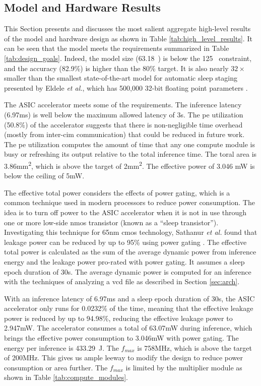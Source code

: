 \subsection{Model and Hardware Results}
This Section presents and discusses the most salient aggregate high-level results of the model and hardware design as shown in Table \ref{tab:high_level_results}.
It can be seen that the model meets the requirements summarized in Table \ref{tab:design_goals}. Indeed, the model size (63.18\si{\kilo\byte}) is below the
125\si{\kilo\byte} constraint, and the accuracy (82.9\%) is higher than the 80\% target. It is also nearly $32\times$ smaller than the smallest state-of-the-art
model for automatic sleep staging presented by Eldele \textit{et al.}, which has 500,000 32-bit floating point parameters \cite{eldele2021attention}.

The ASIC accelerator meets some of the requirements. The inference latency (6.97\si{\milli\second}) is well below the maximum allowed latency of 3\si{\second}.
The \ac{pe} utilization (50.8\%) of the accelerator suggests that there is non-negligible time overhead (mostly from inter-\ac{cim} communication) that could be
reduced in future work. The \ac{pe} utilization computes the amount of time that any one compute module is busy or refreshing its output relative to the total inference
time. The toral area is 3.86\si{\square\milli\meter}, which is above the target of 2\si{\square\milli\meter}. The effective power of 3.046 \si{\milli\watt} is below
the ceiling of 5\si{\milli\watt}.

The effective total power considers the effects of power gating, which is a common technique used in modern processors to reduce power consumption. The idea
is to turn off power to the ASIC accelerator when it is not in use through one or more low-side \ac{nmos} transistor (known as a ``sleep transistor''). Investigating
this technique for 65nm \ac{cmos} technology, Sathanur \textit{et al.} found that leakage power can be reduced by up to 95\% using power gating \cite{sathanur2008quantifying}.
The effective total power is calculated as the sum of the average dynamic power from inference energy and the leakage power pro-rated with power gating. It assumes a
sleep epoch duration of 30\si{\second}. The average dynamic power is computed for an inference with the techniques of analyzing a \ac{vcd} file as described in 
Section \ref{sec:arch}.

With an inference latency of 6.97\si{\milli\second} and a sleep epoch duration of 30\si{\second}, the ASIC accelerator only runs for 0.0232\% of the time, meaning
that the effective leakage power is reduced by up to 94.98\%, reducing the effective leakage power to 2.947\si{\milli\watt}. The accelerator consumes a total of
63.07\si{\milli\watt} during inference, which brings the effective power consumption to 3.046\si{\milli\watt} with power gating. The energy per inference is
433.29\si{\mu\joule}. The $f_{max}$ is 758\si{\mega\hertz}, which is above the target of 200\si{\mega\hertz}. This gives us ample leeway to modify the design to reduce
power consumption or area further. The $f_{max}$ is limited by the multiplier module as shown in Table \ref{tab:compute_modules}.

